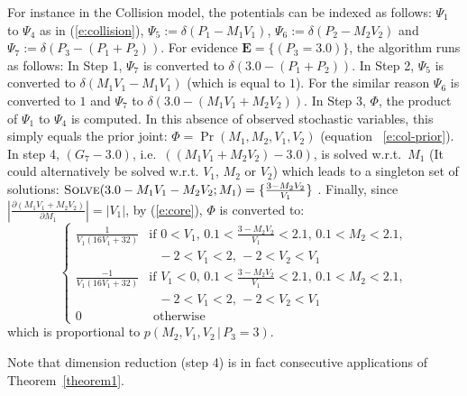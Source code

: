 \documentclass{article}
\newcommand{\bvec}[1]{\textbf{#1}}
\newcommand{\otherwise}[1]{#1 &\text{ otherwise}}
\newcommand{\pr}{p}
\begin{document}
For instance in the Collision model, 
the potentials can be indexed as follows: 
$\Psi_1$ to $\Psi_4$ as in (\ref{e:collision}),
$\Psi_5 := \delta(P_1 - M_1V_1)$,
$\Psi_6 := \delta(P_2 - M_2V_2)$ and
$\Psi_7 := \delta(P_3 - (P_1 + P_2))$.   
For evidence $\bvec{E} = \{(P_3 = 3.0)\}$, the algorithm runs as follows:
In Step 1, $\Psi_{7}$ is converted to $\delta(3.0 - (P_1 + P_2))$. %
In Step 2, $\Psi_5$ is converted to $\delta(M_1 V_1 - M_1 V_1)$
(which is equal to $1$). For the similar reason $\Psi_6$ is converted to $1$ and $\Psi_7$ to $\delta(3.0 - (M_1 V_1 + M_2 V_2))$.  
In Step 3, $\Phi$, the product of $\Psi_1$ to $\Psi_4$ is computed. In this absence of observed stochastic variables, this simply equals the prior joint: 
$\Phi = \Pr(M_1, M_2, V_1, V_2)$ (equation~ \ref{e:col-prior}).
In step 4, $(G_7 - 3.0)$, i.e.\ $((M_1 V_1 + M_2 V_2) - 3.0)$, is solved w.r.t.\ 
 $M_1$ (It could alternatively be solved w.r.t. $V_1$, $M_2$ or $V_2$)
which leads to a singleton set of solutions:
{\footnotesize
$\textsc{Solve}(3.0 - M_1 V_1 - M_2 V_2; M_1) = \{\frac{3 - M_2 V_2}{V_1}\}$
}.
Finally, since  
$\left| \frac{\partial (M_1 V_1 + M_2 V_2)}{\partial M_1} \right| = |V_1|$, by (\ref{e:core}),
$\Phi$ is converted to:  
{\footnotesize
\begin{equation}  
\label{e:col-prior2}
\begin{cases}
\frac{1}{V_1(16 V_1 + 32)} &{\text{if }\scriptstyle 0<V_1, \, 0.1<\frac{3-M_2 V_2}{V_1}<2.1, \, 0.1<M_2<2.1,}\\
							 &{\;\;\, \scriptstyle -2<V_1<2, \, -2<V_2 < V_1}\\
\frac{-1}{V_1(16 V_1 + 32)} &{\text{if }\scriptstyle V_1<0, \, 0.1<\frac{3-M_2 V_2}{V_1}<2.1, \, 0.1<M_2<2.1,}\\
							 &{\;\;\, \scriptstyle -2<V_1<2, \, -2<V_2 < V_1}\\
 \otherwise{0}
 \end{cases}
\end{equation}
}
which is proportional to $\pr(M_2, V_1, V_2 \,|\, P_3 = 3)$.

Note that dimension reduction (step 4) is 
in fact consecutive applications of  Theorem~\ref{theorem1}.
\end{document}
